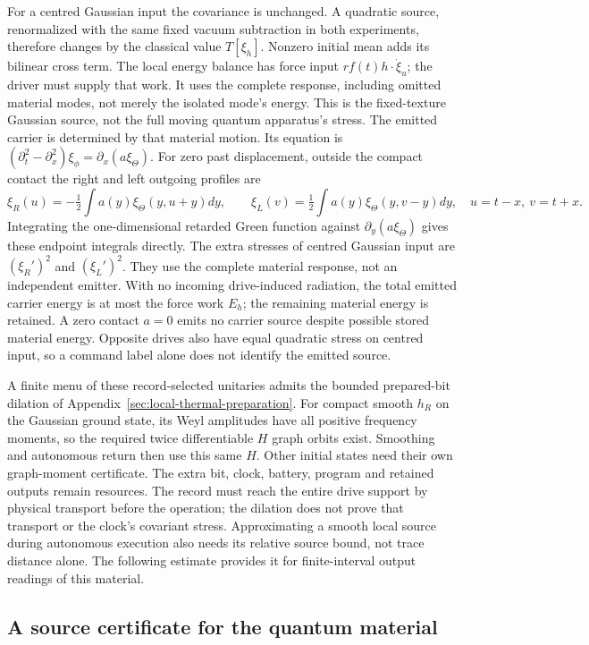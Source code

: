 For a centred Gaussian input the covariance is unchanged. A quadratic
source, renormalized with the same fixed vacuum subtraction in both
experiments, therefore changes by the classical value $T[\xi_h]$.
Nonzero initial mean adds its bilinear cross term.
The local energy balance has force input
$rf(t)h\cdot\dot\xi_u$; the driver must supply that work.
It uses the complete response, including omitted material modes,
not merely the isolated mode's energy. This is the fixed-texture
Gaussian source, not the full moving quantum apparatus's stress.
The emitted carrier is determined by that material motion. Its equation
is $(\partial_t^2-\partial_x^2)\xi_\phi=\partial_x(a\xi_\Theta)$.
For zero past displacement, outside the compact contact the right and
left outgoing profiles are
\[
 \xi_R(u)=-\tfrac12\int a(y)\xi_\Theta(y,u+y)dy,
 \qquad
 \xi_L(v)=\tfrac12\int a(y)\xi_\Theta(y,v-y)dy,
 \quad u=t-x,\ v=t+x.
\]
Integrating the one-dimensional retarded Green function against
$\partial_y(a\xi_\Theta)$ gives these endpoint integrals directly.
The extra stresses of centred Gaussian input are
$(\xi_R')^2$ and $(\xi_L')^2$. They use the complete material response,
not an independent emitter. With no incoming drive-induced radiation,
the total emitted carrier energy is at most the force work $E_h$;
the remaining material energy is retained. A zero contact $a=0$ emits
no carrier source despite possible stored material energy. Opposite
drives also have equal quadratic stress on centred input, so a command
label alone does not identify the emitted source.

A finite menu of these record-selected unitaries admits the bounded
prepared-bit dilation of Appendix~\ref{sec:local-thermal-preparation}.
For compact smooth $h_R$ on the Gaussian ground state, its Weyl
amplitudes have all positive frequency moments, so the required twice
differentiable $H$ graph orbits exist. Smoothing and autonomous return
then use this same $H$. Other initial states need their own graph-moment
certificate. The extra bit, clock, battery, program and retained
outputs remain resources. The record must reach the entire drive
support by physical transport before the operation; the dilation does
not prove that transport or the clock's covariant stress. Approximating
a smooth local source during autonomous execution also needs its
relative source bound, not trace distance alone. The following estimate
provides it for finite-interval output readings of this material.

\subsection{A source certificate for the quantum material}
\label{sec:Gaussian-source-certificate}

